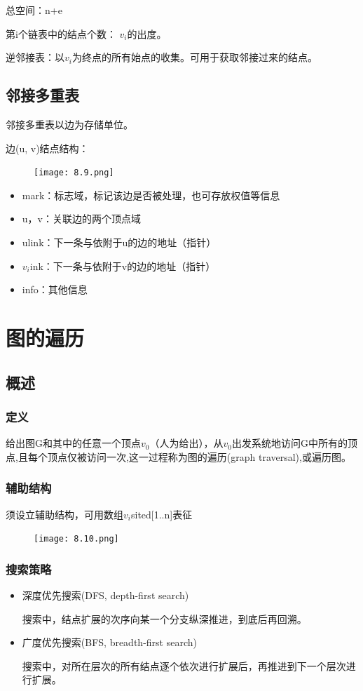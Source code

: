 \documentclass[AutoFakeBold]{LZUThesis2007}
\begin{document}
总空间：n+e

第i个链表中的结点个数： $v_{i}$的出度。

逆邻接表：以$v_{i}$为终点的所有始点的收集。可用于获取邻接过来的结点。
		\subsection{邻接多重表}
邻接多重表以边为存储单位。

边(u, v)结点结构：
\begin{figure}[H]
    \centering
    \texttt{[image: 8.9.png]}
    
    \label{fig_install_texlive}
\end{figure}
\begin{itemize}
	\item mark：标志域，标记该边是否被处理，也可存放权值等信息
	\item u，v：关联边的两个顶点域
	\item ulink：下一条与依附于u的边的地址（指针）
	\item $v_{i}$ink：下一条与依附于v的边的地址（指针）
	\item info：其他信息
\end{itemize}


	\section{图的遍历}
		\subsection{概述}
			\subsubsection{定义}
给出图G和其中的任意一个顶点$v_{0}$（人为给出），从$v_{0}$出发系统地访问G中所有的顶点,且每个顶点仅被访问一次,这一过程称为图的遍历(graph traversal),或遍历图。
			\subsubsection{辅助结构}
须设立辅助结构，可用数组$v_{i}$sited[1..n]表征
\begin{figure}[H]
    \centering
    \texttt{[image: 8.10.png]}
    
    \label{fig_install_texlive}
\end{figure}
			\subsubsection{搜索策略}
\begin{itemize}
	\item 深度优先搜索(DFS, depth-first search)

搜索中，结点扩展的次序向某一个分支纵深推进，到底后再回溯。
	\item 广度优先搜索(BFS, breadth-first search)

搜索中，对所在层次的所有结点逐个依次进行扩展后，再推进到下一个层次进行扩展。
\end{itemize}
\end{document}
